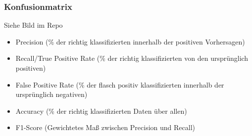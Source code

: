 \documentclass[a4paper]{article}
\begin{document}
\begin{landscape}
\begin{multicols}{3}
        \subsubsection{Konfusionmatrix}
        Siehe Bild im Repo
        \begin{itemize}[noitemsep,nolistsep]
            \item Precision (\% der richtig klassifizierten innerhalb der positiven Vorhersagen)
            \item Recall/True Positive Rate (\% der richtig klassifizierten von den ursprünglich positiven)
            \item False Positive Rate (\% der flasch positiv klassifizierten innerhalb der ursprünglich negativen)
            \item Accuracy (\% der richtig klassifizierten Daten über allen)
            \item F1-Score (Gewichtetes Maß zwischen Precision und Recall)
        \end{itemize}


\end{multicols}
\end{landscape}
\end{document}
